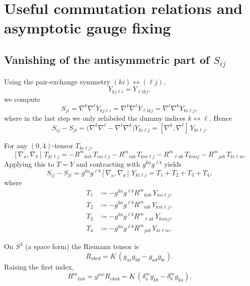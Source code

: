 \documentclass[a4paper,12pt]{article}
\begin{document}
\section{Useful commutation relations and asymptotic gauge fixing}\label{AppD}

\subsection{Vanishing of the antisymmetric part of $S_{ij}$}\label{s}

Using the pair-exchange symmetry \((k i)\leftrightarrow(\ell j)\),
\[
Y_{k j \ell i} = Y_{\ell i k j},
\]
we compute
\[
S_{ji}
= \nabla^{k}\nabla^{\ell} Y_{k j \ell i}
= \nabla^{k}\nabla^{\ell} Y_{\ell i k j}
= \nabla^{\ell}\nabla^{k} Y_{k i \ell j},
\]
where in the last step we only relabeled the dummy indices \(k \leftrightarrow \ell\).
Hence
\[
S_{ij} - S_{ji}
= \bigl(\nabla^{k}\nabla^{\ell} - \nabla^{\ell}\nabla^{k}\bigr) Y_{k i \ell j}
= [\nabla^{k},\nabla^{\ell}]\, Y_{k i \ell j}.
\]

For any \((0,4)\)-tensor \(T_{k i \ell j}\),
\[
[\nabla_{a},\nabla_{b}]\,T_{k i \ell j}
= - R^{m}{}_{k a b}\,T_{m i \ell j}
  - R^{m}{}_{i a b}\,T_{k m \ell j}
  - R^{m}{}_{\ell a b}\,T_{k i m j}
  - R^{m}{}_{j a b}\,T_{k i \ell m}.
\]
Applying this to \(T=Y\) and contracting with \(g^{ka} g^{\ell b}\) yields
\[
S_{ij} - S_{ji}
= g^{ka} g^{\ell b} [\nabla_{a},\nabla_{b}]\,Y_{k i \ell j}
= T_1 + T_2 + T_3 + T_4,
\]
where
\[
\begin{aligned}
T_1 &\coloneqq - g^{ka} g^{\ell b} R^{m}{}_{k a b}\,Y_{m i \ell j},\\
T_2 &\coloneqq - g^{ka} g^{\ell b} R^{m}{}_{i a b}\,Y_{k m \ell j},\\
T_3 &\coloneqq - g^{ka} g^{\ell b} R^{m}{}_{\ell a b}\,Y_{k i m j},\\
T_4 &\coloneqq - g^{ka} g^{\ell b} R^{m}{}_{j a b}\,Y_{k i \ell m}.
\end{aligned}
\]

On \(S^3\) (a space form) the Riemann tensor is
\[
R_{a b c d} = K\,(g_{a c} g_{b d} - g_{a d} g_{b c}).
\]
Raising the first index,
\[
R^{m}{}_{k a b}
= g^{m c} R_{c k a b}
= K\,(\delta^{m}_{a} g_{k b} - \delta^{m}_{b} g_{k a}).
\]
\end{document}
